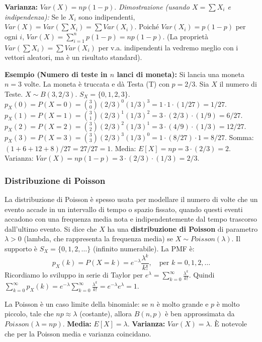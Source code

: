 \textbf{Varianza:} $Var(X) = np(1-p)$.
\textit{Dimostrazione (usando $X=\sum X_i$ e indipendenza):} Se le $X_i$ sono indipendenti, $Var(X) = Var(\sum X_i) = \sum Var(X_i)$.
Poiché $Var(X_i)=p(1-p)$ per ogni $i$, $Var(X) = \sum_{i=1}^n p(1-p) = np(1-p)$.
(La proprietà $Var(\sum X_i) = \sum Var(X_i)$ per v.a. indipendenti la vedremo meglio con i vettori aleatori, ma è un risultato standard).

\begin{example}
\textbf{Esempio (Numero di teste in $n$ lanci di moneta):}
Si lancia una moneta $n=3$ volte. La moneta è truccata e dà Testa (T) con $p=2/3$. Sia $X$ il numero di Teste.
$X \sim B(3, 2/3)$.
$S_X = \{0,1,2,3\}$.
$p_X(0) = P(X=0) = \binom{3}{0} (2/3)^0 (1/3)^3 = 1 \cdot 1 \cdot (1/27) = 1/27$.
$p_X(1) = P(X=1) = \binom{3}{1} (2/3)^1 (1/3)^2 = 3 \cdot (2/3) \cdot (1/9) = 6/27$.
$p_X(2) = P(X=2) = \binom{3}{2} (2/3)^2 (1/3)^1 = 3 \cdot (4/9) \cdot (1/3) = 12/27$.
$p_X(3) = P(X=3) = \binom{3}{3} (2/3)^3 (1/3)^0 = 1 \cdot (8/27) \cdot 1 = 8/27$.
Somma: $(1+6+12+8)/27 = 27/27 = 1$.
Media: $E[X] = np = 3 \cdot (2/3) = 2$.
Varianza: $Var(X) = np(1-p) = 3 \cdot (2/3) \cdot (1/3) = 2/3$.
\end{example}

\subsubsection{Distribuzione di Poisson}
La distribuzione di Poisson è spesso usata per modellare il numero di volte che un evento accade in un intervallo di tempo o spazio fissato, quando questi eventi accadono con una frequenza media nota e indipendentemente dal tempo trascorso dall'ultimo evento.
Si dice che $X$ ha una \textbf{distribuzione di Poisson} di parametro $\lambda > 0$ (lambda, che rappresenta la frequenza media) se $X \sim Poisson(\lambda)$.
Il supporto è $S_X = \{0, 1, 2, \dots\}$ (infinito numerabile).
La PMF è:
\[ p_X(k) = P(X=k) = e^{-\lambda} \frac{\lambda^k}{k!}, \quad \text{per } k=0, 1, 2, \dots \]
Ricordiamo lo sviluppo in serie di Taylor per $e^\lambda = \sum_{k=0}^\infty \frac{\lambda^k}{k!}$.
Quindi $\sum_{k=0}^\infty p_X(k) = e^{-\lambda} \sum_{k=0}^\infty \frac{\lambda^k}{k!} = e^{-\lambda} e^\lambda = 1$.

La Poisson è un caso limite della binomiale: se $n$ è molto grande e $p$ è molto piccolo, tale che $np \approx \lambda$ (costante), allora $B(n,p)$ è ben approssimata da $Poisson(\lambda=np)$.
\textbf{Media:} $E[X] = \lambda$.
\textbf{Varianza:} $Var(X) = \lambda$.
È notevole che per la Poisson media e varianza coincidano.

